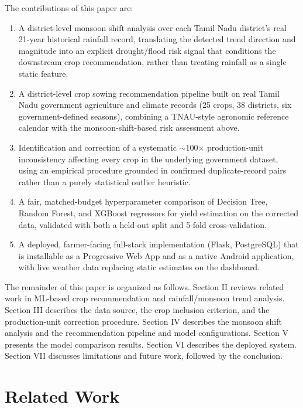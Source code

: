 \documentclass[conference]{IEEEtran}
\begin{document}
The contributions of this paper are:
\begin{enumerate}
  \item A district-level monsoon shift analysis over each Tamil Nadu district's real
        21-year historical rainfall record, translating the detected trend direction
        and magnitude into an explicit drought/flood risk signal that conditions the
        downstream crop recommendation, rather than treating rainfall as a single
        static feature.
  \item A district-level crop sowing recommendation pipeline built on real Tamil Nadu
        government agriculture and climate records (25 crops, 38 districts, six
        government-defined seasons), combining a TNAU-style agronomic reference
        calendar with the monsoon-shift-based risk assessment above.
  \item Identification and correction of a systematic $\sim$100$\times$ production-unit
        inconsistency affecting every crop in the underlying government dataset, using
        an empirical procedure grounded in confirmed duplicate-record pairs rather than
        a purely statistical outlier heuristic.
  \item A fair, matched-budget hyperparameter comparison of Decision Tree, Random
        Forest, and XGBoost regressors for yield estimation on the corrected data,
        validated with both a held-out split and 5-fold cross-validation.
  \item A deployed, farmer-facing full-stack implementation (Flask, PostgreSQL) that is
        installable as a Progressive Web App and as a native Android application, with
        live weather data replacing static estimates on the dashboard.
\end{enumerate}

The remainder of this paper is organized as follows. Section II reviews related work
in ML-based crop recommendation and rainfall/monsoon trend analysis. Section III
describes the data source, the crop inclusion criterion, and the production-unit
correction procedure. Section IV describes the monsoon shift analysis and the
recommendation pipeline and model configurations. Section V presents the model
comparison results. Section VI describes the deployed system. Section VII discusses
limitations and future work, followed by the conclusion.

\section{Related Work}
\end{document}
